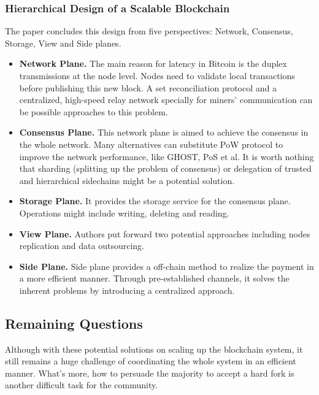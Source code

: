 \documentclass[conference]{IEEEtran}
\begin{document}
\subsubsection{Hierarchical Design of a Scalable Blockchain}
The paper concludes this design from five perspectives: Network, Consensus, Storage, View and Side planes.

\begin{itemize}
    \item \textbf{Network Plane.} The main reason for latency in Bitcoin is the duplex transmissions at the node level. 
    Nodes need to validate local transactions before publishing this new block.
    A set reconciliation protocol and a centralized, high-speed relay network specially for miners' communication can be possible approaches to this problem.
    \item \textbf{Consensus Plane.} This network plane is aimed to achieve the consensus in the whole network. 
    Many alternatives can substitute PoW protocol to improve the network performance, like GHOST, PoS et al.
    It is worth nothing that sharding (splitting up the problem of consensus) or delegation of trusted and hierarchical sidechains might be a potential solution.
    \item \textbf{Storage Plane.} It provides the storage service for the consensus plane. Operations might include writing, deleting and reading.
    \item \textbf{View Plane.} Authors put forward two potential approaches including nodes replication and data outsourcing.
    \item \textbf{Side Plane.} Side plane provides a off-chain method to realize the payment in a more efficient manner. 
    Through pre-established channels, it solves the inherent problems by introducing a centralized approach.
\end{itemize}

\subsection{Remaining Questions}
Although with these potential solutions on scaling up the blockchain system, it still remains a huge challenge of coordinating the whole system in an efficient manner.
%
What's more, how to persuade the majority to accept a hard fork is another difficult task for the community. 



\end{document}
